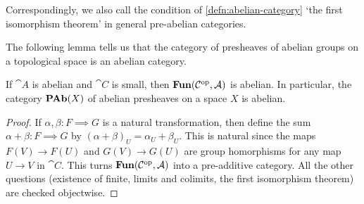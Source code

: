 \documentclass[../main.tex]{subfiles}
\begin{document}
Correspondingly, we also call the condition of \cref{defn:abelian-category} `the first isomorphism theorem' in general pre-abelian categories.

The following lemma tells us that the category of presheaves of abelian groups on a topological space is an abelian category. 
\begin{lem}
If $\cat A$ is abelian and $\cat C$ is small, then $\operatorname{\mathbf{Fun}}(\mathcal{C}^{\mathrm{op}}, \mathcal{A})$ is abelian.
In particular, the category \(\operatorname{\mathbf{PAb}}(X)\) of abelian presheaves on a space \(X\) is abelian.
\end{lem}

\begin{proof}
  If $\alpha, \beta\colon F \implies G$ is a natural transformation, then define the sum $\alpha + \beta\colon F \implies G$ by $(\alpha + \beta)_U = \alpha_U + \beta_U$. This is natural since the maps $F(V) \to F(U)$ and $G(V) \to G(U)$ are group homorphisms for any map $U \to V$ in $\cat C$. This turns $\operatorname{\mathbf{Fun}}(\mathcal{C}^{\mathrm{op}}, \mathcal{A})$ into a pre-additive category. All the other questions (existence of finite, limits and colimits, the first isomorphism theorem) are checked objectwise.
\end{proof}
\end{document}
